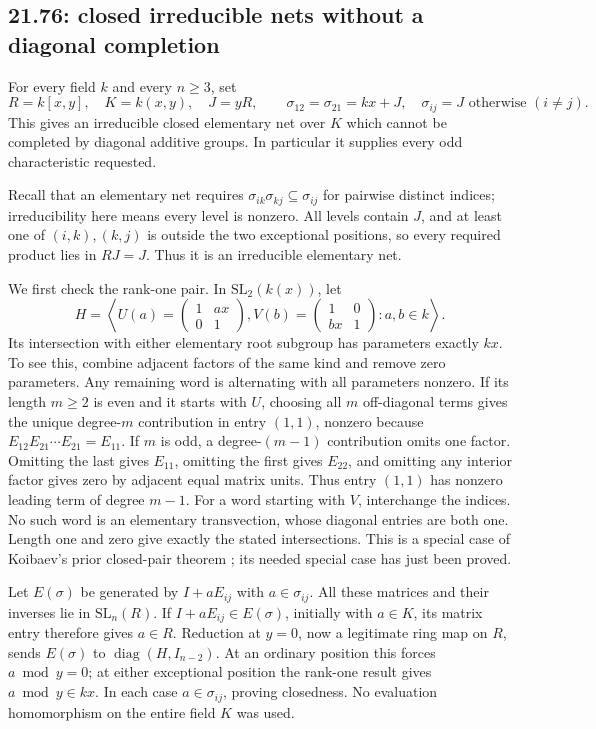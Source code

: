 \subsection{21.76: closed irreducible nets without a diagonal completion}
\label{cand:21.76}
For every field \(k\) and every \(n\ge3\), set
\[
 R=k[x,y],\quad K=k(x,y),\quad J=yR,\qquad
 \sigma_{12}=\sigma_{21}=kx+J,\quad
 \sigma_{ij}=J\text{ otherwise }(i\ne j).
\]
This gives an irreducible closed elementary net over \(K\) which
cannot be completed by diagonal additive groups.
In particular it supplies every odd characteristic requested.

Recall that an elementary net requires
\(\sigma_{ik}\sigma_{kj}\subseteq\sigma_{ij}\) for pairwise distinct
indices; irreducibility here means every level is nonzero.
All levels contain \(J\), and at least one of \((i,k),(k,j)\)
is outside the two exceptional positions, so every required product
lies in \(RJ=J\). Thus it is an irreducible elementary net.

We first check the rank-one pair. In \(\mathrm{SL}_2(k(x))\), let
\[
 H=\left\langle
 U(a)=\begin{pmatrix}1&ax\\0&1\end{pmatrix},
 V(b)=\begin{pmatrix}1&0\\bx&1\end{pmatrix}:a,b\in k
 \right\rangle.
\]
Its intersection with either elementary root subgroup has parameters
exactly \(kx\).
To see this, combine adjacent factors of the same kind and remove
zero parameters. Any remaining word is alternating with all
parameters nonzero. If its length \(m\ge2\) is even and it starts
with \(U\), choosing all \(m\) off-diagonal terms gives the unique
degree-\(m\) contribution in entry \((1,1)\), nonzero because
\(E_{12}E_{21}\cdots E_{21}=E_{11}\).
If \(m\) is odd, a degree-\((m-1)\) contribution omits one factor.
Omitting the last gives \(E_{11}\), omitting the first gives
\(E_{22}\), and omitting any interior factor gives zero by adjacent
equal matrix units. Thus entry \((1,1)\) has nonzero leading term
of degree \(m-1\). For a word starting with \(V\), interchange the
indices. No such word is an elementary transvection, whose diagonal
entries are both one. Length one and zero give exactly the stated
intersections.
This is a special case of Koibaev's prior closed-pair theorem
\cite{koibaev-closed-pairs}; its needed special case has just been proved.

Let \(E(\sigma)\) be generated by \(I+aE_{ij}\) with
\(a\in\sigma_{ij}\).
All these matrices and their inverses lie in \(\mathrm{SL}_n(R)\).
If \(I+aE_{ij}\in E(\sigma)\), initially with \(a\in K\), its
matrix entry therefore gives \(a\in R\).
Reduction at \(y=0\), now a legitimate ring map on \(R\), sends
\(E(\sigma)\) to \(\operatorname{diag}(H,I_{n-2})\).
At an ordinary position this forces \(a\bmod y=0\); at either
exceptional position the rank-one result gives \(a\bmod y\in kx\).
In each case \(a\in\sigma_{ij}\), proving closedness.
No evaluation homomorphism on the entire field \(K\) was used.

